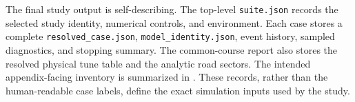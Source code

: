 \documentclass[11pt]{report}
\numberwithin{equation}{section}
\begin{document}
The final study output is self-describing. The top-level
\texttt{suite.json} records the selected study identity, numerical controls,
and environment. Each case stores a complete \texttt{resolved\_case.json},
\texttt{model\_identity.json}, event history, sampled diagnostics, and stopping
summary. The common-course report also stores the resolved physical tune table
and the analytic road sectors. The intended appendix-facing inventory is
summarized in
.
These records, rather than the human-readable case labels, define the exact
simulation inputs used by the study.
\end{document}
